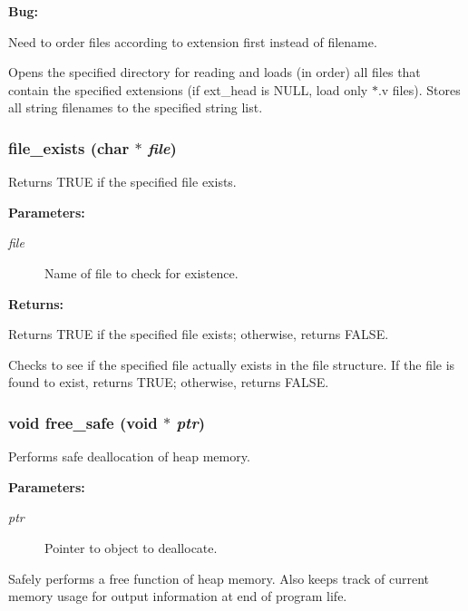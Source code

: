 \begin{Desc}
\item[{\bf {\bf Bug: }}]\par
Need to order files according to extension first instead of filename.\end{Desc}


Opens the specified directory for reading and loads (in order) all files that contain the specified extensions (if ext\_\-head is NULL, load only $\ast$.v files). Stores all string filenames to the specified string list. 
\subsubsection{ file\_\-exists (char $\ast$ {\em file})}\label{util_8h_a7}


Returns TRUE if the specified file exists.

\begin{Desc}
\item[{\bf Parameters: }]\par
\begin{description}
\item[
{\em file}]Name of file to check for existence. \end{description}
\end{Desc}
\begin{Desc}
\item[{\bf Returns: }]\par
Returns TRUE if the specified file exists; otherwise, returns FALSE.

\end{Desc}
Checks to see if the specified file actually exists in the file structure. If the file is found to exist, returns TRUE; otherwise, returns FALSE. 
\subsubsection{\setlength{\rightskip}{0pt plus 5cm}void free\_\-safe (void $\ast$ {\em ptr})}\label{util_8h_a14}


Performs safe deallocation of heap memory.

\begin{Desc}
\item[{\bf Parameters: }]\par
\begin{description}
\item[
{\em ptr}]Pointer to object to deallocate.

\end{description}
\end{Desc}
Safely performs a free function of heap memory. Also keeps track of current memory usage for output information at end of program life. 
